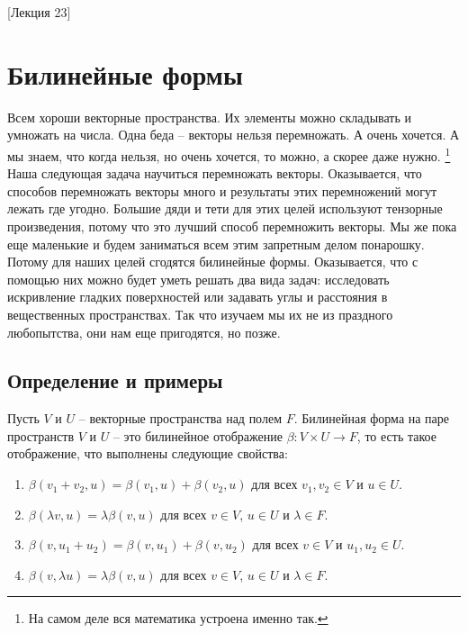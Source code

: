 [Лекция 23]


\newpage
\section{Билинейные формы}

Всем хороши векторные пространства.
Их элементы можно складывать и умножать на числа.
Одна беда -- векторы нельзя перемножать.
А очень хочется.
А мы знаем, что когда нельзя, но очень хочется, то можно, а скорее даже нужно.%
\footnote{На самом деле вся математика устроена именно так.}
Наша следующая задача научиться перемножать векторы.
Оказывается, что способов перемножать векторы много и результаты этих перемножений могут лежать где угодно.
Большие дяди и тети для этих целей используют тензорные произведения, потому что это лучший способ перемножить векторы.
Мы же пока еще маленькие и будем заниматься всем этим запретным делом понарошку.
Потому для наших целей сгодятся билинейные формы.
Оказывается, что с помощью них можно будет уметь решать два вида задач: исследовать искривление гладких поверхностей или задавать углы и расстояния в вещественных пространствах.
Так что изучаем мы их не из праздного любопытства, они нам еще пригодятся, но позже.

\subsection{Определение и примеры}

\begin{definition}
\label{def::BilinearForms}
Пусть $V$ и $U$ -- векторные пространства над полем $F$.
Билинейная форма на паре пространств $V$ и $U$ -- это билинейное отображение $\beta\colon V\times U \to F$, то есть такое отображение, что выполнены следующие свойства:
\begin{enumerate}
\item $\beta(v_1 + v_2, u) = \beta(v_1,u) + \beta(v_2,u)$ для всех $v_1,v_2\in V$ и $u\in U$.

\item $\beta(\lambda v, u) = \lambda \beta(v,u)$ для всех $v\in V$, $u\in U$ и $\lambda\in F$.

\item $\beta(v, u_1+u_2) = \beta(v, u_1) + \beta(v,u_2)$ для всех $v\in V$ и $u_1,u_2\in U$.

\item $\beta(v,\lambda u) = \lambda\beta(v,u)$ для всех $v\in V$, $u\in U$ и $\lambda\in F$.
\end{enumerate}
\end{definition}

